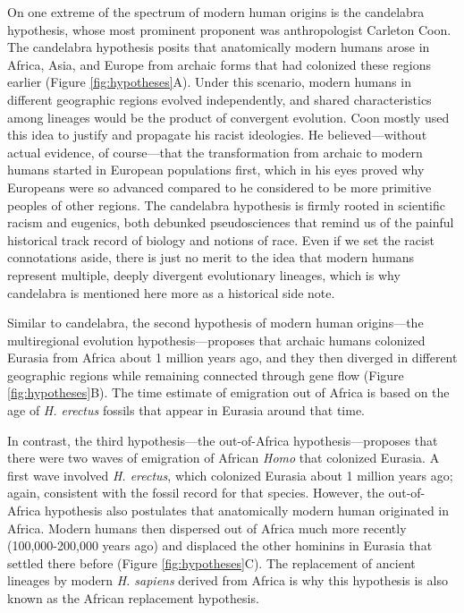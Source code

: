 \documentclass[
]{book}
\begin{document}
On one extreme of the spectrum of modern human origins is the candelabra hypothesis, whose most prominent proponent was anthropologist Carleton Coon. The candelabra hypothesis posits that anatomically modern humans arose in Africa, Asia, and Europe from archaic forms that had colonized these regions earlier (Figure \ref{fig:hypotheses}A). Under this scenario, modern humans in different geographic regions evolved independently, and shared characteristics among lineages would be the product of convergent evolution. Coon mostly used this idea to justify and propagate his racist ideologies. He believed---without actual evidence, of course---that the transformation from archaic to modern humans started in European populations first, which in his eyes proved why Europeans were so advanced compared to he considered to be more primitive peoples of other regions. The candelabra hypothesis is firmly rooted in scientific racism and eugenics, both debunked pseudosciences that remind us of the painful historical track record of biology and notions of race. Even if we set the racist connotations aside, there is just no merit to the idea that modern humans represent multiple, deeply divergent evolutionary lineages, which is why candelabra is mentioned here more as a historical side note.

Similar to candelabra, the second hypothesis of modern human origins---the multiregional evolution hypothesis---proposes that archaic humans colonized Eurasia from Africa about 1 million years ago, and they then diverged in different geographic regions while remaining connected through gene flow (Figure \ref{fig:hypotheses}B). The time estimate of emigration out of Africa is based on the age of \emph{H. erectus} fossils that appear in Eurasia around that time.

In contrast, the third hypothesis---the out-of-Africa hypothesis---proposes that there were two waves of emigration of African \emph{Homo} that colonized Eurasia. A first wave involved \emph{H. erectus}, which colonized Eurasia about 1 million years ago; again, consistent with the fossil record for that species. However, the out-of-Africa hypothesis also postulates that anatomically modern human originated in Africa. Modern humans then dispersed out of Africa much more recently (100,000-200,000 years ago) and displaced the other hominins in Eurasia that settled there before (Figure \ref{fig:hypotheses}C). The replacement of ancient lineages by modern \emph{H. sapiens} derived from Africa is why this hypothesis is also known as the African replacement hypothesis.
\end{document}
